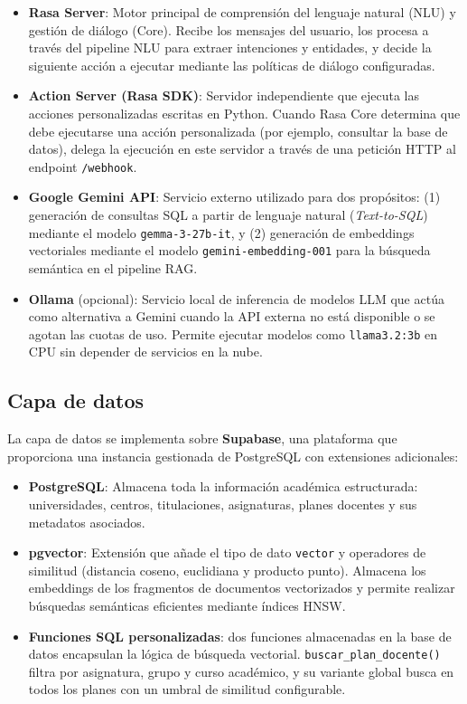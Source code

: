 \begin{itemize}
    \item \textbf{Rasa Server}: Motor principal de comprensión del lenguaje natural (NLU) y gestión de diálogo (Core). Recibe los mensajes del usuario, los procesa a través del pipeline NLU para extraer intenciones y entidades, y decide la siguiente acción a ejecutar mediante las políticas de diálogo configuradas.
    \item \textbf{Action Server (Rasa SDK)}: Servidor independiente que ejecuta las acciones personalizadas escritas en Python. Cuando Rasa Core determina que debe ejecutarse una acción personalizada (por ejemplo, consultar la base de datos), delega la ejecución en este servidor a través de una petición HTTP al endpoint \texttt{/webhook}.
    \item \textbf{Google Gemini API}: Servicio externo utilizado para dos propósitos: (1) generación de consultas SQL a partir de lenguaje natural (\textit{Text-to-SQL}) mediante el modelo \texttt{gemma-3-27b-it}, y (2) generación de embeddings vectoriales mediante el modelo \texttt{gemini-embedding-001} para la búsqueda semántica en el pipeline RAG.
    \item \textbf{Ollama} (opcional): Servicio local de inferencia de modelos LLM que actúa como alternativa a Gemini cuando la API externa no está disponible o se agotan las cuotas de uso. Permite ejecutar modelos como \texttt{llama3.2:3b} en CPU sin depender de servicios en la nube.
\end{itemize}

\subsection{Capa de datos}\label{subsec:capa-datos}

La capa de datos se implementa sobre \textbf{Supabase}, una plataforma que proporciona una instancia gestionada de PostgreSQL con extensiones adicionales:

\begin{itemize}
    \item \textbf{PostgreSQL}: Almacena toda la información académica estructurada: universidades, centros, titulaciones, asignaturas, planes docentes y sus metadatos asociados.
    \item \textbf{pgvector}: Extensión que añade el tipo de dato \texttt{vector} y operadores de similitud (distancia coseno, euclidiana y producto punto). Almacena los embeddings de los fragmentos de documentos vectorizados y permite realizar búsquedas semánticas eficientes mediante índices HNSW.
    \item \textbf{Funciones SQL personalizadas}: dos funciones almacenadas en la base de datos encapsulan la lógica de búsqueda vectorial. \texttt{buscar\_plan\_docente()} filtra por asignatura, grupo y curso académico, y su variante global busca en todos los planes con un umbral de similitud configurable.
\end{itemize}

